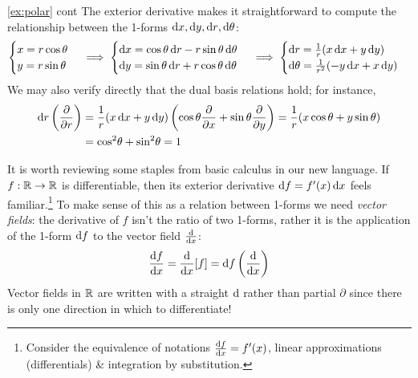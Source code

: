 \begin{example*}{\ref*{ex:polar} cont}{}
The exterior derivative makes it straightforward to compute the relationship between the 1-forms $\dx,\dy,\dr,\dth$:
\[\begin{cases}
x=r\cos\theta\\
y=r\sin\theta
\end{cases} \implies \begin{cases}
\dx=\cos\theta\,\dr-r\sin\theta\,\dth\\
\dy=\sin\theta\,\dr+r\cos\theta\,\dth
\end{cases}
\implies
\begin{cases}
\dr=\frac 1r(x\,\dx+y\,\dy)\\
\dth=\frac 1{r^2}(-y\,\dx+x\,\dy)
\end{cases}\]
We may also verify directly that the dual basis relations hold; for instance,
\begin{align*}
\dr\left(\partials r\right) &=\frac 1r(x\,\dx+y\,\dy)\left(\cos\theta\partials x+\sin\theta\partials y\right) =\frac 1r(x\cos\theta+y\sin\theta)\\
&=\cos^2\!\theta+\sin^2\!\theta=1
\end{align*}
\end{example*}

\vfil\goodbreak


It is worth reviewing some staples from basic calculus in our new language.\smallbreak
If $f:\R\to\R$ is differentiable, then its exterior derivative $\df=f'(x)\,\dx$ feels familiar.\footnote{Consider the equivalence of notations $\diff[f]{x}=f'(x)$, linear approximations (differentials) \& integration by substitution.} To make sense of this as a relation between 1-forms we need \emph{vector fields}: the derivative of $f$ isn't the ratio of two 1-forms, rather it is the application of the 1-form $\df$ to the vector field $\diff x$:
\[\diff[f]{x}=\diff x[f]=\df\left(\diff x\right)\]
Vector fields in $\R$ are written with a straight $\D$ rather than partial $\partial$ since there is only one direction in which to differentiate!\smallbreak


